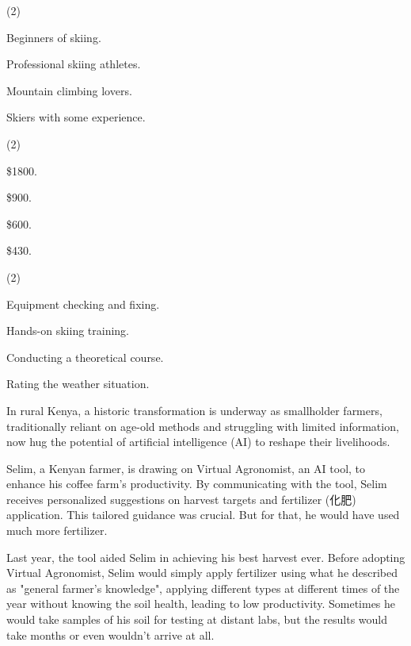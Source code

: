 \documentclass{英语试卷}
\begin{document}
\begin{choices}(2)
  \item Beginners of skiing.
  \item Professional skiing athletes.
  \item Mountain climbing lovers.
  \item Skiers with some experience.
\end{choices}
\begin{choices}(2)
  \item \$1800.
  \item \$900.
  \item \$600.
  \item \$430.
\end{choices}
\begin{choices}(2)
  \item Equipment checking and fixing.
  \item Hands-on skiing training.
  \item Conducting a theoretical course.
  \item Rating the weather situation.
\end{choices}
\par In rural Kenya, a historic transformation is underway as smallholder farmers, traditionally reliant on age-old methods and struggling with limited information, now hug the potential of artificial intelligence (AI) to reshape their livelihoods.\par
\par Selim, a Kenyan farmer, is drawing on Virtual Agronomist, an AI tool, to enhance his coffee farm's productivity. By communicating with the tool, Selim receives personalized suggestions on harvest targets and fertilizer (化肥) application. This tailored guidance was crucial. But for that, he would have used much more fertilizer.\par
\par Last year, the tool aided Selim in achieving his best harvest ever. Before adopting Virtual Agronomist, Selim would simply apply fertilizer using what he described as "general farmer's knowledge", applying different types at different times of the year without knowing the soil health, leading to low productivity. Sometimes he would take samples of his soil for testing at distant labs, but the results would take months or even wouldn't arrive at all.\par
\end{document}
